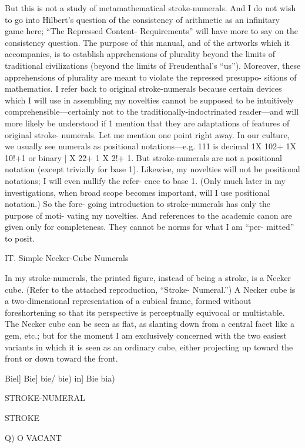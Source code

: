 But this is not a study of metamathematical stroke-numerals. And 
I do not wish to go into Hilbert’s question of the consistency of 
arithmetic as an infinitary game here; “The Repressed Content- 
Requirements” will have more to say on the consistency question. The 
purpose of this manual, and of the artworks which it accompanies, is to 
establish apprehensions of plurality beyond the limits of traditional 
civilizations (beyond the limits of Freudenthal’s “us”). Moreover, these 
apprehensions of plurality are meant to violate the repressed presuppo- 
sitions of mathematics. I refer back to original stroke-numerals because 
certain devices which I will use in assembling my novelties cannot be 
supposed to be intuitively comprehensible—certainly not to the 
traditionally-indoctrinated reader—and will more likely be understood 
if 1 mention that they are adaptations of features of original stroke- 
numerals. Let me mention one point right away. In our culture, we 
usually see numerals as positional notations—e.g. 111 is decimal 
1X 102+ 1X 10!+1 or binary | X 22+ 1 X 2!+ 1. But stroke-numerals 
are not a positional notation (except trivially for base 1). Likewise, my 
novelties will not be positional notations; I will even nullify the refer- 
ence to base 1. (Only much later in my investigations, when broad 
scope becomes important, will I use positional notation.) So the fore- 
going introduction to stroke-numerals has only the purpose of moti- 
vating my novelties. And references to the academic canon are given 
only for completeness. They cannot be norms for what I am “per- 
mitted” to posit. 


IT. Simple Necker-Cube Numerals 


In my stroke-numerals, the printed figure, instead of being a 
stroke, is a Necker cube. (Refer to the attached reproduction, “Stroke- 
Numeral.”) A Necker cube is a two-dimensional representation of a 
cubical frame, formed without foreshortening so that its perspective is 
perceptually equivocal or multistable. The Necker cube can be seen as 
flat, as slanting down from a central facet like a gem, etc.; but for the 
moment I am exclusively concerned with the two easiest variants in 
which it is seen as an ordinary cube, either projecting up toward the 
front or down toward the front. 


Biel] Bie] bie/ bie) in] Bie bia) 


STROKE-NUMERAL 


STROKE 


Q) 
O VACANT 


